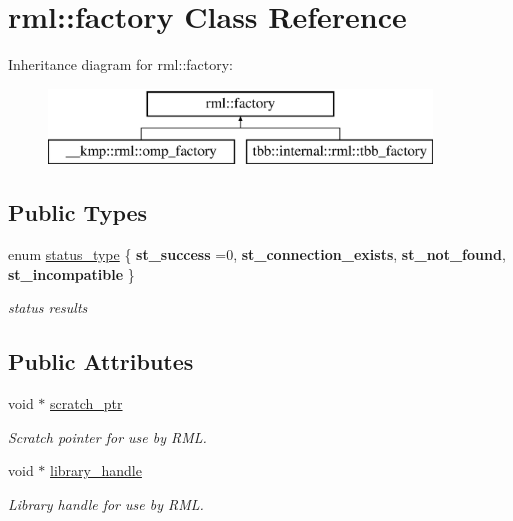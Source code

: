 \hypertarget{classrml_1_1factory}{}\section{rml\+:\+:factory Class Reference}
\label{classrml_1_1factory}
Inheritance diagram for rml\+:\+:factory\+:\begin{figure}[H]
\begin{center}
\leavevmode
\includegraphics[height=2.000000cm]{classrml_1_1factory}
\end{center}
\end{figure}
\subsection*{Public Types}
\begin{DoxyCompactItemize}
\item 
\hypertarget{classrml_1_1factory_a4c1de6c79581a01b37d4ff16340e44c9}{}enum \hyperlink{classrml_1_1factory_a4c1de6c79581a01b37d4ff16340e44c9}{status\+\_\+type} \{ {\bfseries st\+\_\+success} =0, 
{\bfseries st\+\_\+connection\+\_\+exists}, 
{\bfseries st\+\_\+not\+\_\+found}, 
{\bfseries st\+\_\+incompatible}
 \}\label{classrml_1_1factory_a4c1de6c79581a01b37d4ff16340e44c9}
\begin{DoxyCompactList}\small\item\em status results \end{DoxyCompactList}
\end{DoxyCompactItemize}
\subsection*{Public Attributes}
\begin{DoxyCompactItemize}
\item 
\hypertarget{classrml_1_1factory_a777c37aa94b84c7a7a3cdfa584361523}{}void $\ast$ \hyperlink{classrml_1_1factory_a777c37aa94b84c7a7a3cdfa584361523}{scratch\+\_\+ptr}\label{classrml_1_1factory_a777c37aa94b84c7a7a3cdfa584361523}

\begin{DoxyCompactList}\small\item\em Scratch pointer for use by R\+M\+L. \end{DoxyCompactList}\item 
\hypertarget{classrml_1_1factory_a51d29a39a9a8fb6b9a4b5939daa96c0b}{}void $\ast$ \hyperlink{classrml_1_1factory_a51d29a39a9a8fb6b9a4b5939daa96c0b}{library\+\_\+handle}\label{classrml_1_1factory_a51d29a39a9a8fb6b9a4b5939daa96c0b}

\begin{DoxyCompactList}\small\item\em Library handle for use by R\+M\+L. \end{DoxyCompactList}\end{DoxyCompactItemize}
